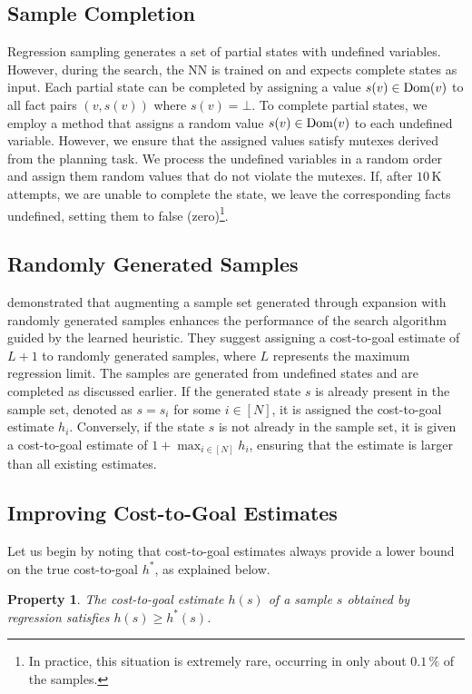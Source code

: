 \documentclass[ppgc,diss,english]{iiufrgs}
\newtheorem{property}{Property}
\begin{document}
\subsection{Sample Completion}
Regression sampling generates a set of partial states with undefined variables. However, during the search, the NN is trained on and expects complete states as input.
Each partial state can be completed by assigning a value $s(v)\in\operatorname{Dom}(v)$ to all fact pairs $(v,s(v))$ where $s(v)=\bot$.
To complete partial states, we employ a method that assigns a random value $s(v) \in \operatorname{Dom}(v)$ to each undefined variable. However, we ensure that the assigned values satisfy mutexes derived from the planning task. We process the undefined variables in a random order and assign them random values that do not violate the mutexes. If, after $10$\,K attempts, we are unable to complete the state, we leave the corresponding facts undefined, setting them to false (zero)\footnote{In practice, this situation is extremely rare, occurring in only about $0.1\,\%$ of the samples.}.

\subsection{Randomly Generated Samples}
\citet{OToole/2022} demonstrated that augmenting a sample set generated through expansion with randomly generated samples enhances the performance of the search algorithm guided by the learned heuristic. They suggest assigning a cost-to-goal estimate of $L+1$ to randomly generated samples, where $L$ represents the maximum regression limit.
The samples are generated from undefined states and are completed as discussed earlier. If the generated state $s$ is already present in the sample set, denoted as $s = s_i$ for some $i\in[N]$, it is assigned the cost-to-goal estimate $h_i$. Conversely, if the state $s$ is not already in the sample set, it is given a cost-to-goal estimate of $1+\max_{i\in[N]} h_i$, ensuring that the estimate is larger than all existing estimates.

\subsection{Improving Cost-to-Goal Estimates}

Let us begin by noting that cost-to-goal estimates always provide a lower bound on the true cost-to-goal $h^{*}$, as explained below.

\begin{property}
\label{prop:hvalue}
The cost-to-goal estimate $h(s)$ of a sample $s$ obtained by regression satisfies $h(s)\geq h^*(s)$.
\end{property}
\end{document}
